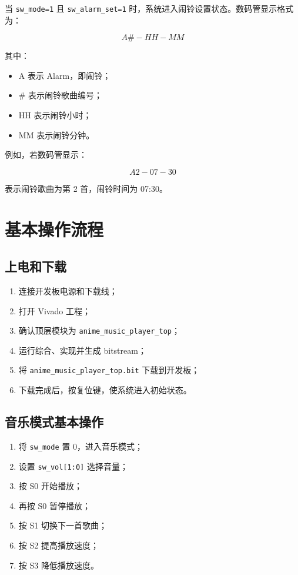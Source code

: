 \documentclass[UTF8,a4paper,12pt]{ctexart}
\newcommand{\port}[1]{\texttt{#1}}
\begin{document}
当 \port{sw\_mode=1} 且 \port{sw\_alarm\_set=1} 时，系统进入闹铃设置状态。数码管显示格式为：

\[
A\#-HH-MM
\]

其中：

\begin{itemize}
  \item A 表示 Alarm，即闹铃；
  \item \# 表示闹铃歌曲编号；
  \item HH 表示闹铃小时；
  \item MM 表示闹铃分钟。
\end{itemize}

例如，若数码管显示：

\[
A2-07-30
\]

表示闹铃歌曲为第 2 首，闹铃时间为 07:30。

\section{基本操作流程}

\subsection{上电和下载}

\begin{enumerate}
  \item 连接开发板电源和下载线；
  \item 打开 Vivado 工程；
  \item 确认顶层模块为 \port{anime\_music\_player\_top}；
  \item 运行综合、实现并生成 bitstream；
  \item 将 \port{anime\_music\_player\_top.bit} 下载到开发板；
  \item 下载完成后，按复位键，使系统进入初始状态。
\end{enumerate}

\subsection{音乐模式基本操作}

\begin{enumerate}
  \item 将 \port{sw\_mode} 置 0，进入音乐模式；
  \item 设置 \port{sw\_vol[1:0]} 选择音量；
  \item 按 S0 开始播放；
  \item 再按 S0 暂停播放；
  \item 按 S1 切换下一首歌曲；
  \item 按 S2 提高播放速度；
  \item 按 S3 降低播放速度。
\end{enumerate}
\end{document}
